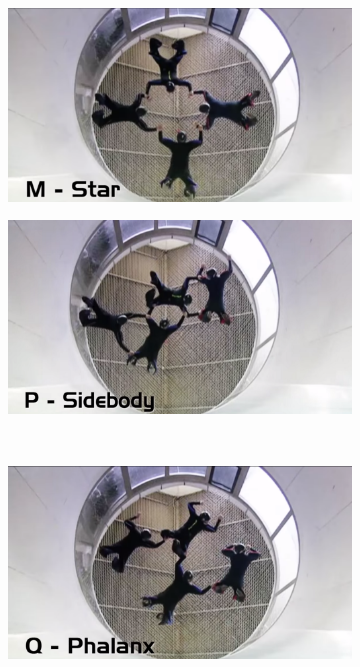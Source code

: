 \documentclass[a4paper, 12pt]{article}
\begin{document}
%
\begin{figure}[H]
	\centering
	\begin{subfigure}{.5\textwidth}
		\centering
		\includegraphics[width=0.9\linewidth]{Tunnel_Star.png}
	\end{subfigure}%
	\begin{subfigure}{.5\textwidth}
		\centering
		\includegraphics[width=0.9\linewidth]{Tunnel_Sidebody.png}
	\end{subfigure}\\
	\begin{subfigure}{.5\textwidth}
		\centering
		\includegraphics[width=0.9\linewidth]{Tunnel_Phalanx.png}

\end{subfigure}
\end{figure}
\end{document}
